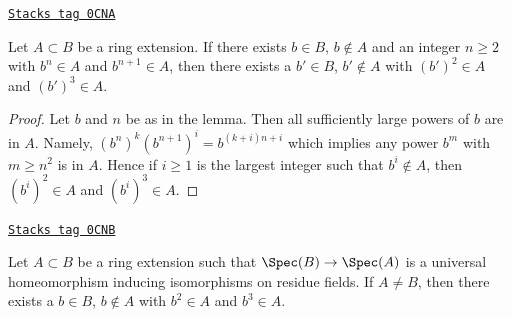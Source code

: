 \begin{lemma}
\label{morphisms-lemma-nth-and-nplusone-implies-square-and-cube}
\href{https://stacks.math.columbia.edu/tag/0CNA}{\texttt{Stacks tag 0CNA}}

Let $A \subset B$ be a ring extension. If there exists
$b \in B$, $b \not \in A$ and an integer $n \geq 2$ with
$b^n \in A$ and $b^{n + 1} \in A$, then there exists a
$b' \in B$, $b' \not \in A$
with $(b')^2 \in A$ and $(b')^3 \in A$.
\end{lemma}

\begin{proof}
Let $b$ and $n$ be as in the lemma.
Then all sufficiently large powers of $b$ are in $A$.
Namely, $(b^n)^k(b^{n + 1})^i = b^{(k + i)n + i}$
which implies any power $b^m$ with $m \geq n^2$ is in $A$.
Hence if $i \geq 1$ is the largest integer such that
$b^i \not \in A$, then $(b^i)^2 \in A$ and $(b^i)^3 \in A$.
\end{proof}

\begin{lemma}
\label{morphisms-lemma-square-and-cube}
\href{https://stacks.math.columbia.edu/tag/0CNB}{\texttt{Stacks tag 0CNB}}

Let $A \subset B$ be a ring extension such that $\Spec(B) \to \Spec(A)$
is a universal homeomorphism inducing isomorphisms on residue fields.
If $A \not = B$, then there exists a $b \in B$, $b \not \in A$ with
$b^2 \in A$ and $b^3 \in A$.
\end{lemma}

